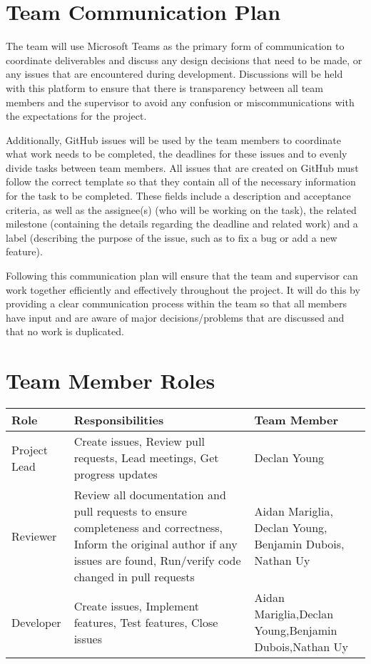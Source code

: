 \documentclass{article}
\begin{document}
\section{Team Communication Plan}

The team will use Microsoft Teams as the primary form of communication to coordinate deliverables and discuss any design decisions that need to be made, or any issues that are encountered during development. Discussions will be held with this platform to ensure that there is transparency between all team members and the supervisor to avoid any confusion or miscommunications with the expectations for the project. 

Additionally, GitHub issues will be used by the team members to coordinate what work needs to be completed, the deadlines for these issues and to evenly divide tasks between team members. All issues that are created on GitHub must follow the correct template so that they contain all of the necessary information for the task to be completed. These fields include a description and acceptance criteria, as well as the assignee(s) (who will be working on the task), the related milestone (containing the details regarding the deadline and related work) and a label (describing the purpose of the issue, such as to fix a bug or add a new feature).

Following this communication plan will ensure that the team and supervisor can work together efficiently and effectively throughout the project. It will do this by providing a clear communication process within the team so that all members have input and are aware of major decisions/problems that are discussed and that no work is duplicated.


\section{Team Member Roles}

\begin{table}[H]
\begin{tabular}{|p{3cm}|p{4cm}|p{3cm}|}
\hline
\textbf{Role} & \textbf{Responsibilities} & \textbf{Team Member} \\ \hline

Project Lead & Create issues, Review pull requests, Lead meetings, Get progress updates & Declan Young \\ \hline

Reviewer & Review all documentation and pull requests to ensure completeness and correctness, Inform the original author if any issues are found, Run/verify code changed in pull requests & Aidan Mariglia, Declan Young, Benjamin Dubois, Nathan Uy \\ \hline

Developer & Create issues, Implement features, Test features, Close issues & Aidan Mariglia,Declan Young,Benjamin Dubois,Nathan Uy \\ \hline
\end{tabular}
\end{table}
\end{document}
